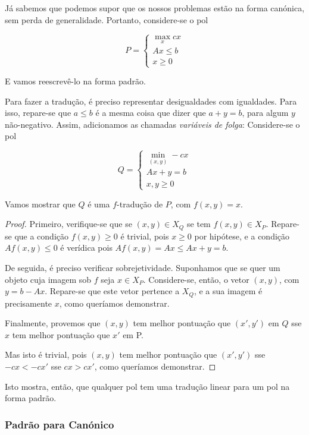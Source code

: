\documentclass{article}
\theoremstyle{definition}
\begin{document}
	Já sabemos que podemos supor que os nossos problemas estão na forma canónica, sem perda de generalidade. Portanto, considere-se o pol
	
	
	\[
	P =
	\begin{cases}
	\max\limits_x cx\\
	Ax \leq b\\
	x \geq 0
	\end{cases}
	\]
	
	E vamos reescrevê-lo na forma padrão.
	
	Para fazer a tradução, é preciso representar desigualdades com igualdades. Para isso, repare-se que $a \leq b$ é a mesma coisa que dizer que $a + y = b$, para algum $y$ não-negativo. Assim, adicionamos as chamadas \emph{variáveis de folga}: Considere-se o pol
	
	\[
	Q =
	\begin{cases}
	\min\limits_{(x,y)} -cx\\
	Ax + y = b\\
	x, y \geq 0
	\end{cases}
	\]
	
	Vamos mostrar que $Q$ é uma $f$-tradução de $P$, com $f(x,y) = x$.
	
	\begin{proof}
	Primeiro, verifique-se que se $(x,y) \in X_Q$ se tem $f(x,y) \in X_P$. Repare-se que a condição $f(x,y) \geq 0$ é trivial, pois $x \geq 0$ por hipótese, e a condição $A f(x,y) \leq 0$ é verídica pois $A f(x,y) = Ax \leq Ax + y = b$.
	
	De seguida, é preciso verificar sobrejetividade. Suponhamos que se quer um objeto cuja imagem sob $f$ seja $x \in X_P$. Considere-se, então, o vetor $(x,y)$, com $y = b - Ax$. Repare-se que este vetor pertence a $X_Q$, e a sua imagem é precisamente $x$, como queríamos demonstrar.
	
	Finalmente, provemos que $(x,y)$ tem melhor pontuação que $(x',y')$ em $Q$ sse $x$ tem melhor pontuação que $x'$ em P.
	
	Mas isto é trivial, pois $(x,y)$ tem melhor pontuação que $(x',y')$ sse $-cx < -cx'$ sse $cx > cx'$, como queríamos demonstrar.
	\end{proof}
	
	Isto mostra, então, que qualquer pol tem uma tradução linear para um pol na forma padrão.
	
	\subsubsection{Padrão para Canónico}
	
\end{document}
